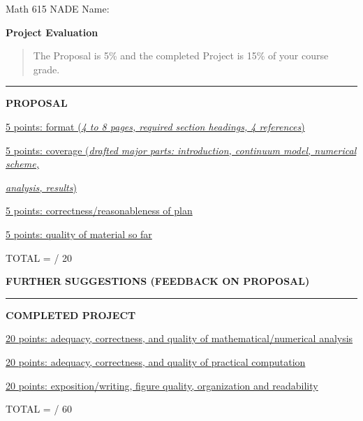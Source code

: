 \documentclass[11pt]{amsart}
\newcommand{\normalspacing}{\renewcommand{\baselinestretch}{1.05}
        \tiny\normalsize}
\begin{document}
\scriptsize
\noindent Math 615 NADE \hfill \Large Name:\underline{\phantom{DLFJD SFLKJSD sdfa asdf  asdf}}

\thispagestyle{empty}
\bigskip

\Large\centerline{\textbf{Project Evaluation}}
\normalsize\normalspacing

\bigskip

\begin{quote}
The Proposal is 5\% and the completed Project is 15\% of your course grade.
\end{quote}

\noindent\rule{\textwidth}{0.7mm}
\bigskip

\large\centerline{\textbf{PROPOSAL}}
\bigskip

\noindent \underline{5 points: format (\emph{4 to 8 pages, required section headings, 4 references})}
\vfill

\noindent \underline{5 points: coverage (\emph{drafted major parts: introduction, continuum model, numerical scheme,}}

\noindent \underline{\emph{analysis, results})}
\vfill

\noindent \underline{5 points: correctness/reasonableness of plan}
\vfill

\noindent \underline{5 points: quality of material so far}
\vfill

\hfill TOTAL = \phantom{foo bar} / 20

\newpage


\large\centerline{\textbf{FURTHER SUGGESTIONS (FEEDBACK ON PROPOSAL)}}
\bigskip

\vspace{3.0in}

\noindent\rule{\textwidth}{0.7mm}
\bigskip

\large\centerline{\textbf{COMPLETED PROJECT}}
\bigskip

\noindent \underline{20 points: adequacy, correctness, and quality of mathematical/numerical analysis}
\vfill

\noindent \underline{20 points: adequacy, correctness, and quality of practical computation}
\vfill

\noindent \underline{20 points: exposition/writing, figure quality, organization and readability}
\vfill

\hfill TOTAL = \phantom{foo bar} / 60
\end{document}
